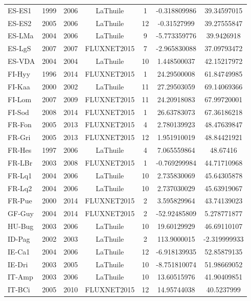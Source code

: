 \begin{center}
\begin{longtable}{lcccccc}
ES-ES1 & 1999 & 2006 & LaThuile    & 1      & -0.318809986 & 39.34597015  \\
ES-ES2 & 2005 & 2006 & LaThuile    & 12     & -0.31527999  & 39.27555847  \\
ES-LMa & 2004 & 2006 & LaThuile    & 9      & -5.773359776 & 39.9426918   \\
ES-LgS & 2007 & 2007 & FLUXNET2015 & 7      & -2.965830088 & 37.09793472  \\
ES-VDA & 2004 & 2004 & LaThuile    & 10     & 1.448500037  & 42.15217972  \\
FI-Hyy & 1996 & 2014 & FLUXNET2015 & 1      & 24.29500008  & 61.84749985  \\
FI-Kaa & 2000 & 2002 & LaThuile    & 11     & 27.29503059  & 69.14069366  \\
FI-Lom & 2007 & 2009 & FLUXNET2015 & 11     & 24.20918083  & 67.99720001  \\
FI-Sod & 2008 & 2014 & FLUXNET2015 & 1      & 26.63783073  & 67.36186218  \\
FR-Fon & 2005 & 2013 & FLUXNET2015 & 4      & 2.780139923  & 48.47639847  \\
FR-Gri & 2005 & 2013 & FLUXNET2015 & 12     & 1.951910019  & 48.84421921  \\
FR-Hes & 1997 & 2006 & LaThuile    & 4      & 7.065559864  & 48.67416     \\
FR-LBr & 2003 & 2008 & FLUXNET2015 & 1      & -0.769299984 & 44.71710968  \\
FR-Lq1 & 2004 & 2006 & LaThuile    & 10     & 2.735830069  & 45.64305878  \\
FR-Lq2 & 2004 & 2006 & LaThuile    & 10     & 2.737030029  & 45.63919067  \\
FR-Pue & 2000 & 2014 & FLUXNET2015 & 2      & 3.595829964  & 43.74139023  \\
GF-Guy & 2004 & 2014 & FLUXNET2015 & 2      & -52.92485809 & 5.278771877  \\
HU-Bug & 2003 & 2006 & LaThuile    & 10     & 19.60129929  & 46.69110107  \\
ID-Pag & 2002 & 2003 & LaThuile    & 2      & 113.9000015  & -2.319999933 \\
IE-Ca1 & 2004 & 2006 & LaThuile    & 12     & -6.918139935 & 52.85879135  \\
IE-Dri & 2003 & 2005 & LaThuile    & 10     & -8.751810074 & 51.98669052  \\
IT-Amp & 2003 & 2006 & LaThuile    & 10     & 13.60515976  & 41.90409851  \\
IT-BCi & 2005 & 2010 & FLUXNET2015 & 12     & 14.95744038  & 40.5237999   \\

\end{longtable}
\end{center}
